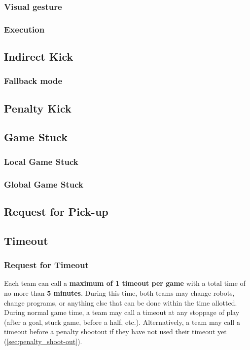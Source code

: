 \subsubsection{Visual gesture}
\subsubsection{Execution}

\subsection{Indirect Kick}
\subsubsection{Fallback mode}

\subsection{Penalty Kick}

\subsection{Game Stuck}
\subsubsection{Local Game Stuck}
\subsubsection{Global Game Stuck}

\subsection{Request for Pick-up}

\subsection{Timeout}
\subsubsection{Request for Timeout}
\label{sec:request_for_timeout}

Each team can call a \textbf{maximum of 1 timeout per game} with a total time of no more than \textbf{5 minutes}.
During this time, both teams may change robots, change programs, or anything else that can be done within the time allotted.
During normal game time, a team may call a timeout at any stoppage of play (after a goal, stuck game, before a half, etc.).
Alternatively, a team may call a timeout before a penalty shootout if they have not used their timeout yet (\cf \cref{sec:penalty_shoot-out}).


